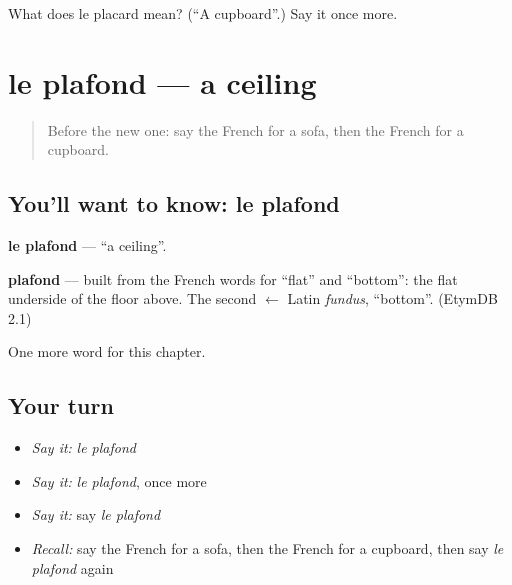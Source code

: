 \begin{tcolorbox}[breakable,colback=teal!4,colframe=teal!35!black,title={Before you move on}]
What does le placard mean? (\textquotedblleft{}A cupboard\textquotedblright{}.) Say it once more.
\end{tcolorbox}
\section[le plafond]{le plafond — a ceiling}

\label{lesson:FR-C76-plafond}



\begin{quote}
Before the new one: say the French for a sofa, then the French for a cupboard.
\end{quote}

\subsection*{You'll want to know: le plafond}
\textbf{le plafond} — \textquotedblleft{}a ceiling\textquotedblright{}.

\begin{cousinweb}
\textbf{plafond} — built from the French words for \textquotedblleft{}flat\textquotedblright{} and \textquotedblleft{}bottom\textquotedblright{}: the flat underside of the floor above. The second $\leftarrow$ Latin \emph{fundus}, \textquotedblleft{}bottom\textquotedblright{}. (EtymDB 2.1)
\end{cousinweb}

\begin{grammarlens}[title={What you've built}]
One more word for this chapter.
\end{grammarlens}

\subsection*{Your turn}
\begin{itemize}
\raggedright
  \item \emph{Say it:} \emph{le plafond}
  \item \emph{Say it:} \emph{le plafond}, once more
  \item \emph{Say it:} say \emph{le plafond}
  \item \emph{Recall:} say the French for a sofa, then the French for a cupboard, then say \emph{le plafond} again
\end{itemize}

